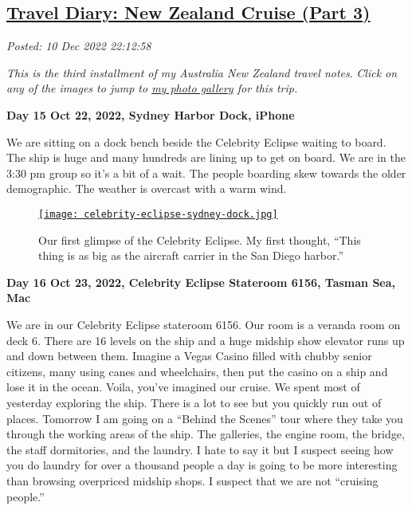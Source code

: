%

\subsection*{\href{https://analyzethedatanotthedrivel.org/2022/12/10/travel-diary-new-zealand-cruise-part-3/}{Travel Diary: New Zealand Cruise (Part 3)}}


\noindent\emph{Posted: 10 Dec 2022 22:12:58}
\vspace{6pt}

\emph{This is the third installment of my Australia New Zealand travel
notes}. \emph{Click on any of the images to jump to
\href{https://conceptcontrol.smugmug.com/Trips/Overseas/Australia-New-Zealand-2022/}{my
photo gallery} for this trip.}


\textbf{Day 15 Oct 22, 2022, Sydney Harbor Dock, iPhone}

We are sitting on a dock bench beside the Celebrity Eclipse waiting to
board. The ship is huge and many hundreds are lining up to get on board.
We are in the 3:30 pm group so it's a bit of a wait. The people boarding
skew towards the older demographic. The weather is overcast with a warm
wind.

\captionsetup[figure]{labelformat=empty}
\begin{SCfigure}
\centering
\href{https://conceptcontrol.smugmug.com/Trips/Overseas/Australia-New-Zealand-2022/i-VvRjC49/A}{\texttt{[image: celebrity-eclipse-sydney-dock.jpg]}}
\caption[Our first glimpse of the Celebrity Eclipse]{Our first glimpse of the Celebrity Eclipse. My first thought,
``This thing is as big as the aircraft carrier in the San Diego
harbor.''}
\label{fig:7606x0}
\end{SCfigure}

\textbf{Day 16 Oct 23, 2022, Celebrity Eclipse Stateroom 6156, Tasman Sea, Mac}

We are in our Celebrity Eclipse stateroom 6156. Our room is a veranda
room on deck 6. There are 16 levels on the ship and a huge midship show
elevator runs up and down between them. Imagine a Vegas Casino filled
with chubby senior citizens, many using canes and wheelchairs, then put
the casino on a ship and lose it in the ocean. Voila, you've imagined
our cruise. We spent most of yesterday exploring the ship. There is a
lot to see but you quickly run out of places. Tomorrow I am going on a
``Behind the Scenes'' tour where they take you through the working areas
of the ship. The galleries, the engine room, the bridge, the staff
dormitories, and the laundry. I hate to say it but I suspect seeing how
you do laundry for over a thousand people a day is going to be more
interesting than browsing overpriced midship shops. I suspect that we
are not ``cruising people.''

